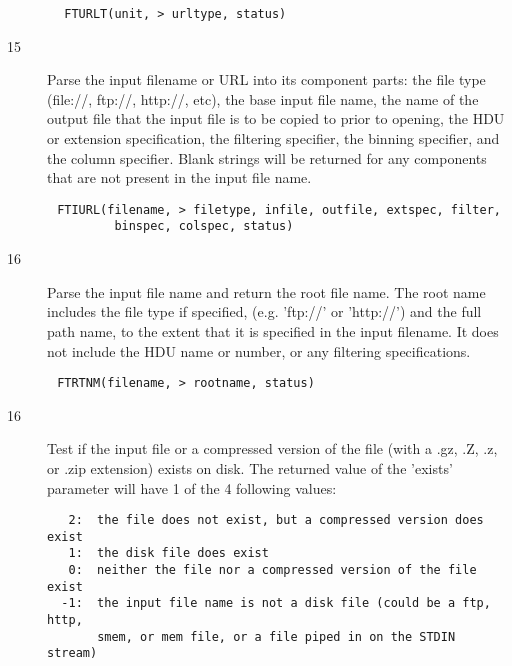 \documentclass[11pt]{book}
\begin{document}
\begin{verbatim}
        FTURLT(unit, > urltype, status)
\end{verbatim}

\begin{description}
\item[15]  Parse the input filename or URL into its component parts: the file
type (file://, ftp://, http://, etc), the base input file name, the
name of the output file that the input file is to be copied to prior
to opening, the HDU or extension specification, the filtering
specifier, the binning specifier, and the column specifier.  Blank
strings will be returned for any components that are not present
in the input file name.
\end{description}

\begin{verbatim}
       FTIURL(filename, > filetype, infile, outfile, extspec, filter,
               binspec, colspec, status)
\end{verbatim}

\begin{description}
\item[16] Parse the input file name and return the root file name.  The root
name includes the file type if specified, (e.g.  'ftp://' or 'http://')
and the full path name, to the extent that it is specified in the input
filename.  It does not include the HDU name or number, or any filtering
specifications.
\end{description}

\begin{verbatim}
       FTRTNM(filename, > rootname, status)
\end{verbatim}


\begin{description}
\item[16] Test if the input file or a compressed version of the file (with
a .gz, .Z, .z, or .zip extension) exists on disk.  The returned value of
the 'exists' parameter will have 1 of the 4 following values:

\begin{verbatim}
   2:  the file does not exist, but a compressed version does exist
   1:  the disk file does exist
   0:  neither the file nor a compressed version of the file exist
  -1:  the input file name is not a disk file (could be a ftp, http,
       smem, or mem file, or a file piped in on the STDIN stream)
\end{verbatim}

\end{description}
\end{document}
